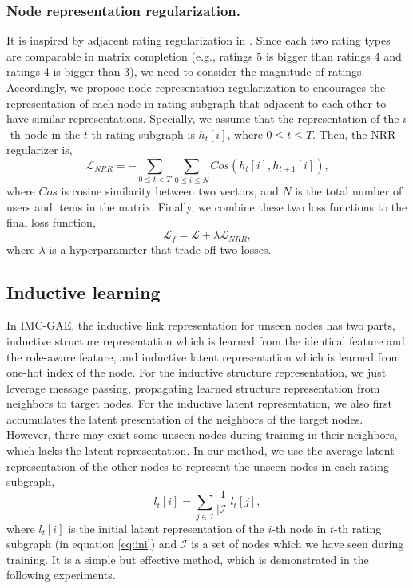 \documentclass[sigconf]{acmart}
\begin{document}
\subsubsection{Node representation regularization.} 
It is inspired by adjacent rating regularization in \cite{zhang2019inductive}. 
Since each two rating types are comparable in matrix completion (e.g., ratings 5 is bigger than ratings 4 and ratings 4 is bigger than 3), we need to consider the magnitude of ratings. Accordingly,  we propose node representation regularization to encourages the representation of each node in rating subgraph that adjacent to each other to have similar representations. 
Specially, we assume that the representation of the $i$-th node in the $t$-th rating subgraph is $h_t[i]$, where $0 \leq t \leq T$. 
Then, the NRR regularizer is,
\begin{equation}
    \mathcal{L}_{NRR} = -\sum_{0 \leq t < T}\sum_{0 \leq i \leq N} Cos(h_t[i], h_{t+1}[i]),
\end{equation}
where $Cos$ is cosine similarity between two vectors, and
$N$ is the total number of users and items in the matrix. Finally, we combine these two loss functions to the final loss function,
\begin{equation}
\label{eq:loss}
    \mathcal{L}_{f} = \mathcal{L} + \lambda \mathcal{L}_{NRR},
\end{equation}
where $\lambda$ is a hyperparameter that trade-off two losses.

\subsection{Inductive learning}
In IMC-GAE, the inductive link representation for unseen nodes has two parts, inductive structure representation which is learned from the identical feature and the role-aware feature, and inductive latent representation which is learned from one-hot index of the node. 
For the inductive structure representation, we just leverage message passing, propagating learned structure representation from neighbors to target nodes. 
For the inductive latent representation, we also first accumulates the latent presentation of the neighbors of the target nodes. However, there may exist some unseen nodes during training in their neighbors, which lacks the latent representation. 
In our method, we use the average latent representation of the other nodes to represent the unseen nodes in each rating subgraph,
\vspace{-5pt}
\begin{equation}
    l_t[i] = \sum_{ j \in {\mathcal{I}}} \frac{1}{|{\mathcal{I}}|} l_t[j],
\end{equation}
where $l_t[i]$ is the initial latent representation of the $i$-th node in $t$-th rating subgraph (in equation \ref{eq:ini}) and $\mathcal{I}$ is a set of nodes which we have seen during training. It is a simple but effective method, which is demonstrated in the following experiments.
\end{document}
